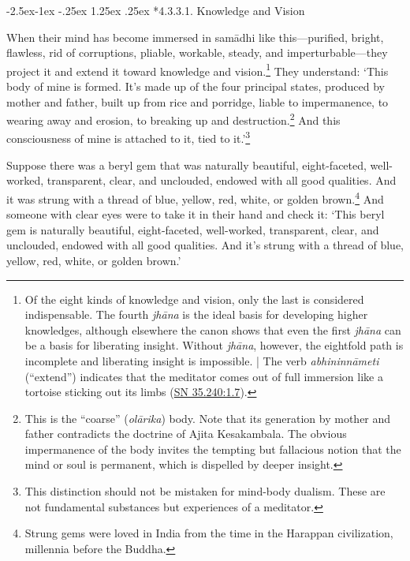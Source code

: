 \documentclass[12pt,openany]{book}%
\makeatletter
\renewcommand\paragraph{\@startsection{paragraph}{4}{\z@}%
            {-2.5ex\@plus -1ex \@minus -.25ex}%
            {1.25ex \@plus .25ex}%
            {\noindent\normalfont\itshape\small}}
\makeatother
\begin{document}
\paragraph*{4.3.3.1. Knowledge and Vision }

When their mind has become immersed in \textsanskrit{samādhi} like this—purified, bright, flawless, rid of corruptions, pliable, workable, steady, and imperturbable—they project it and extend it toward knowledge and vision.\footnote{Of the eight kinds of knowledge and vision, only the last is considered indispensable. The fourth \textit{\textsanskrit{jhāna}} is the ideal basis for developing higher knowledges, although elsewhere the canon shows that even the first \textit{\textsanskrit{jhāna}} can be a basis for liberating insight. Without \textit{\textsanskrit{jhāna}}, however, the eightfold path is incomplete and liberating insight is impossible. | The verb \textit{\textsanskrit{abhininnāmeti}} (“extend”) indicates that the meditator comes out of full immersion like a tortoise sticking out its limbs (\href{https://suttacentral.net/sn35.240/en/sujato\#1.7}{SN 35.240:1.7}). } They understand: ‘This body of mine is formed. It’s made up of the four principal states, produced by mother and father, built up from rice and porridge, liable to impermanence, to wearing away and erosion, to breaking up and destruction.\footnote{This is the “coarse” (\textit{\textsanskrit{olārika}}) body. Note that its generation by mother and father contradicts the doctrine of Ajita Kesakambala. The obvious impermanence of the body invites the tempting but fallacious notion that the mind or soul is permanent, which is dispelled by deeper insight. } And this consciousness of mine is attached to it, tied to it.’\footnote{This distinction should not be mistaken for mind-body dualism. These are not fundamental substances but experiences of a meditator. } 

Suppose there was a beryl gem that was naturally beautiful, eight-faceted, well-worked, transparent, clear, and unclouded, endowed with all good qualities. And it was strung with a thread of blue, yellow, red, white, or golden brown.\footnote{Strung gems were loved in India from the time in the Harappan civilization, millennia before the Buddha. } And someone with clear eyes were to take it in their hand and check it: ‘This beryl gem is naturally beautiful, eight-faceted, well-worked, transparent, clear, and unclouded, endowed with all good qualities. And it’s strung with a thread of blue, yellow, red, white, or golden brown.’ 
\end{document}
